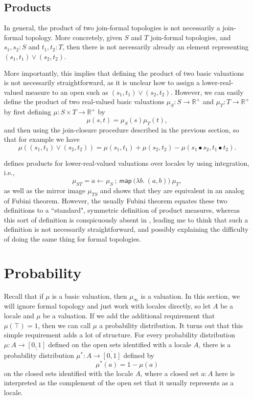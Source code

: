 \documentclass{article}           %
\newcommand{\R}{\mathbb{R}}
\newcommand{\map}[2]{\mathsf{map}\ {#1}\ {#2}}
\newcommand{\fun}[2]{\lambda {#1}.\  {#2}}
\begin{document}
\subsection{Products}

In general, the product of two join-formal topologies is not necessarily a join-formal topology. More concretely, given $S$ and $T$ join-formal topologies, and $s_1, s_2 : S$ and $t_1, t_2 : T$, then there is not necessarily already an element representing $(s_1, t_1) \vee (s_2, t_2)$.

More importantly, this implies that defining the product of two basic valuations is not necessarily straightforward, as it is unclear how to assign a lower-real-valued measure to an open such as $(s_1, t_1) \vee (s_2, t_2)$. However, we can easily define the product of two real-valued basic valuations $\mu_S : S \to \R^+$ and $\mu_T : T \to \R^+$ by first defining $\mu : S \times T \to \R^+$ by
\[
\mu(s, t) = \mu_S(s) \mu_T(t),
\]
and then using the join-closure procedure described in the previous section, so that for example we have
\[
\mu((s_1, t_1) \vee (s_2, t_2)) = \mu(s_1, t_1) + \mu(s_2, t_2) - \mu(s_1 \bullet s_2, t_1 \bullet t_2).
\]

\cite{vickers2011} defines products for lower-real-valued valuations over locales by using integration, i.e.,
\[
\mu_{ST} = a \leftarrow \mu_S \ ; \ \map{(\fun{b}{(a, b))}}{\mu_T},
\]
as well as the mirror image $\mu_{TS}$ and shows that they are equivalent in an analog of Fubini theorem. However, the usually Fubini theorem equates these two definitions to a ``standard", symmetric definition of product measures, whereas this sort of definition is conspicuously absent in \cite{vickers2011}, leading me to think that such a definition is not necessarily straightforward, and possibly explaining the difficulty of doing the same thing for formal topologies.

\section{Probability}

Recall that if $\mu$ is a basic valuation, then $\mu_\infty$ is a valuation. In this section, we will ignore formal topology and just work with locales directly, so let $A$ be a locale and $\mu$ be a valuation. If we add the additional requirement that $\mu(\top) = 1$, then we can call $\mu$ a probability distribution. It turns out that this simple requirement adds a lot of structure. For every probability distribution $\mu : A \to \underline{[0,1]}$ defined on the open sets identified with a locale $A$, there is a probability distribution $\mu^* : A \to \overline{[0,1]}$ defined by
\[
\mu^*(a) = 1 - \mu(a)
\]
on the closed sets identified with the locale $A$, where a closed set $a : A$ here is interpreted as the complement of the open set that it usually represents as a locale.
\end{document}
